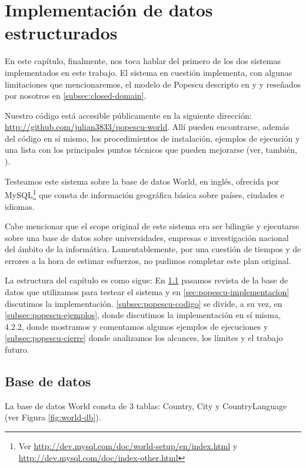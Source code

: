 \chapter{Implementación de datos estructurados}
\label{chap:4}
En este capítulo, finalmente, nos toca hablar del primero de los dos sistemas implementados en este trabajo.
El sistema en cuestión implementa, con algunas limitaciones que mencionaremos, el modelo de Popescu descripto en \cite{QADB1} y \cite{QADB2} y reseñados por nosotros en \ref{subsec:closed-domain}.

Nuestro código está accesible públicamente en la siguiente dirección: \url{http://github.com/julian3833/popescu-world}. Allí pueden encontrarse, además del código en sí mismo, los procedimientos de instalación, ejemplos de ejecución y una lista con los principales puntos técnicos que pueden mejorarse (ver, también, ).

Testeamos este sistema sobre la base de datos World, en inglés, ofrecida por MySQL\footnote{Ver \url{http://dev.mysql.com/doc/world-setup/en/index.html} y \url{http://dev.mysql.com/doc/index-other.html}} que consta de información geográfica básica sobre países, ciudades e idiomas.

Cabe mencionar que el scope original de este sistema era ser bilingüe y ejecutarse sobre una base de datos sobre universidades, empresas e investigación nacional del ámbito de la informática. Lamentablemente, por una cuestión de tiempos y de errores a la hora de estimar esfuerzos, no pudimos completar este plan original.

La estructura del capítulo es como sigue: En \ref{sec:popescu-db} pasamos revista de la base de datos que utilizamos para testear el sistema y en \ref{sec:popescu-implementacion} discutimos la implementación. \ref{subsec:popescu-codigo} se divide, a su vez, en \ref{subsec:popescu-ejemplos}, donde discutimos la implementación en sí misma, 4.2.2, donde mostramos y comentamos algunos ejemplos de ejecuciones y \ref{subsec:popescu-cierre} donde analizamos los alcances, los límites y el trabajo futuro.


\section{Base de datos}
\label{sec:popescu-db}

La base de datos World consta de 3 tablas: Country, City y CountryLanguage (ver Figura \ref{fig:world-db}).

